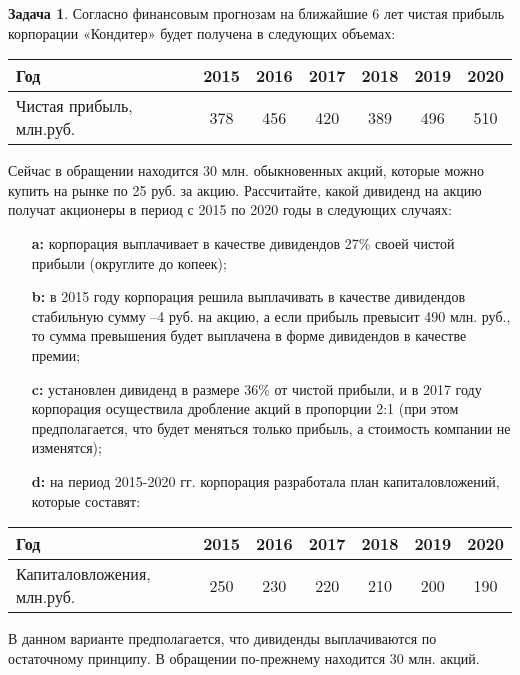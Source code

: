 \documentclass[a4paper, 14pt]{article}
\theoremstyle{plain} %
\theoremstyle{definition} %
\newtheorem{problem}{Задача}[subsection]
\theoremstyle{remark} %
\begin{document}
\begin{problem}
	Согласно финансовым прогнозам на ближайшие 6 лет чистая прибыль корпорации «Кондитер» будет получена в следующих объемах:
\begin{center}
\begin{tabular}[0.88\textwidth]{|l|c|c|c|c|c|c|}
\hline
Год                      & 2015 & 2016 & 2017 & 2018 & 2019 & 2020  \\
\hline
Чистая прибыль, млн.руб. & 378  & 456  & 420  & 389  & 496  & 510   \\
\hline
\end{tabular}
\end{center}
	Сейчас в обращении находится 30 млн. обыкновенных акций, которые можно купить на рынке по 25 руб. за акцию. Рассчитайте, какой дивиденд на акцию получат акционеры в период с 2015 по 2020 годы в следующих случаях:
	\begin{itemize}
		\item[\textbf{a:}] корпорация  выплачивает  в  качестве  дивидендов  27\%  своей  чистой  прибыли (округлите до копеек);
		\item[\textbf{b:}] в 2015 году корпорация решила выплачивать в качестве дивидендов стабильную сумму –4 руб. на акцию, а если прибыль превысит 490 млн. руб., то сумма превышения будет выплачена в форме дивидендов в качестве премии;
		\item[\textbf{c:}] установлен дивиденд в размере 36\% от чистой прибыли, и в 2017 году корпорация осуществила дробление акций в пропорции 2:1 (при этом предполагается, что будет меняться только прибыль, а стоимость компании не изменятся);
		\item[\textbf{d:}] на период 2015-2020 гг. корпорация разработала план капиталовложений, которые составят:
	\end{itemize}
	\begin{center}
	\begin{tabular}[0.88\textwidth]{|l|c|c|c|c|c|c|}
	\hline
	Год                        & 2015 & 2016 & 2017 & 2018 & 2019 & 2020  \\
	\hline
	Капиталовложения, млн.руб. & 250  & 230  & 220  & 210  & 200  & 190   \\
	\hline
	\end{tabular}
\end{center}

	В данном варианте предполагается, что дивиденды выплачиваются по остаточному принципу. В  обращении  по-прежнему  находится  30  млн.  акций.


\end{problem}
\end{document}
